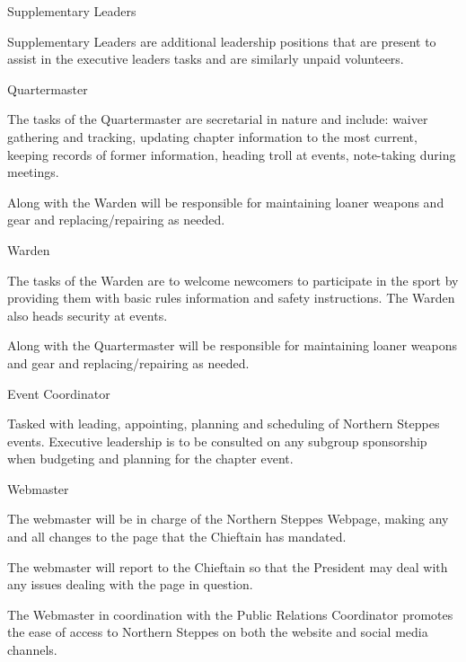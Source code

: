 \documentclass[12pt]{article}
\begin{document}
\begin{level}
    \item Supplementary Leaders
    \begin{level} 
        \item Supplementary Leaders are additional leadership positions that are present to assist in the
    executive leaders tasks and are similarly unpaid volunteers.
        \item Quartermaster
        \begin{level} 
            \item The tasks of the Quartermaster are secretarial in nature and include: waiver gathering and tracking, updating chapter information to the most current, keeping records of former information, heading troll at events, note-taking during meetings.
            \item Along with the Warden will be responsible for maintaining loaner weapons and gear and replacing/repairing as needed.
        \end{level}
        \item Warden
        \begin{level} 
            \item The tasks of the Warden are to welcome newcomers to participate in the sport by providing them with basic rules information and safety instructions. The Warden also heads security at events.
            \item Along with the Quartermaster will be responsible for maintaining loaner weapons and gear and replacing/repairing as needed.
        \end{level}
        \item Event Coordinator
        \begin{level} 
            \item Tasked with leading, appointing, planning and scheduling of Northern Steppes events. Executive leadership is to be consulted on any subgroup sponsorship when budgeting and planning for the chapter event.
        \end{level}
        \item Webmaster
        \begin{level} 
            \item The webmaster will be in charge of the Northern Steppes Webpage, making any and all changes to the page that the Chieftain has mandated.
            \item The webmaster will report to the Chieftain so that the President may deal with any issues dealing with the page in question.
            \item The Webmaster in coordination with the Public Relations Coordinator promotes the ease of access to Northern Steppes on both the website and social media channels.

\end{level}
\end{level}
\end{level}
\end{document}
